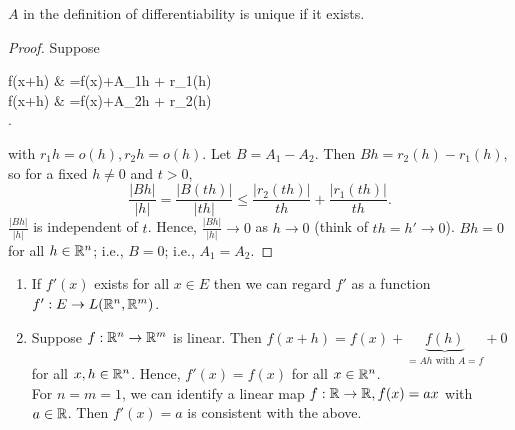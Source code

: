 \begin{thm}[12]
	$A$ in the definition of differentiability is unique if it exists.
	\begin{proof}
		Suppose
		\begin{flalign*}
			f(x+h) & =f(x)+A_{1}h + r_{1}(h) \\
			f(x+h) & =f(x)+A_{2}h + r_{2}(h) \\
			.\end{flalign*}
		with $r_{1}h=o(h), r_{2}h=o(h)$.
		Let $B=A_{1}-A_{2}$. Then $Bh=r_{2}(h)-r_{1}(h)$, so for a fixed $h\neq 0$ and $t>0$, \[
			\frac{\left|Bh\right|}{\left|h\right|}= \frac{\left|B(th)\right|}{\left|th\right|} \le \frac{\left|r_{2}(th)\right|}{th}+\frac{\left|r_{1}(th)\right|}{th}.\]
		$\frac{\left|Bh\right|}{\left|h\right|}$ is independent of $t$. Hence, $\frac{\left|Bh\right|}{\left|h\right|}\to 0$ as $h\to 0$ (think of $th=h'\to 0$).
		$Bh=0$ for all $h \in \mathbb{R}^{n}$; i.e., $B=0$; i.e., $A_{1}=A_{2}$.
	\end{proof}
	\begin{note}
		\begin{enumerate}
			\item If $f'(x)$ exists for all $x \in E$ then we can regard $f'$ as a function $f':E\to L(\mathbb{R}^{n},\mathbb{R}^{m})$.
			\item Suppose $f: \mathbb{R}^{n}\to \mathbb{R}^{m}$ is linear. Then $f(x+h)=f(x)+\underbrace{f(h)}_{=Ah \text{ with } A=f}+0$ for all $x,h \in \mathbb{R}^{n}$.
			      Hence, $f'(x)=f(x)$ for all $x \in \mathbb{R}^{n}$.\\
			      For $n=m=1$, we can identify a linear map $f: \mathbb{R}\to \mathbb{R}, f(x)=ax$ with $a \in \mathbb{R}$. Then $f'(x)=a$ is consistent with the above.
		\end{enumerate}
	\end{note}

\end{thm}


